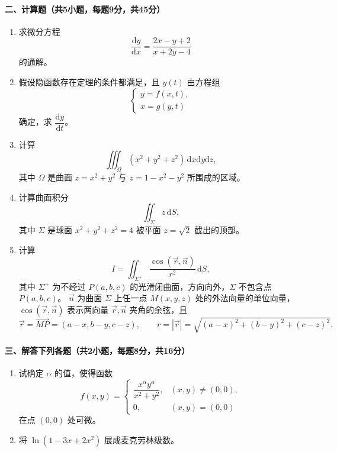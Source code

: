 \paragraph*{二、计算题（共5小题，每题9分，共45分）}
\begin{enumerate}
  \item 求微分方程
  \[
    \frac{\mathrm{d}y}{\mathrm{d}x}=\frac{2x-y+2}{x+2y-4}
  \]
  的通解。

  \item 假设隐函数存在定理的条件都满足，且 \(y(t)\) 由方程组
  \[
    \begin{cases}
      y=f(x,t),\\
      x=g(y,t)
    \end{cases}
  \]
  确定，求 \(\dfrac{\mathrm{d}y}{\mathrm{d}t}\)。

  \item 计算
  \[
    \iiint_\Omega (x^2+y^2+z^2)\,\mathrm{d}x\mathrm{d}y\mathrm{d}z,
  \]
  其中 \(\Omega\) 是曲面 \(z=x^2+y^2\) 与 \(z=1-x^2-y^2\) 所围成的区域。

  \item 计算曲面积分
  \[
    \iint_\Sigma z\,\mathrm{d}S,
  \]
  其中 \(\Sigma\) 是球面 \(x^2+y^2+z^2=4\) 被平面 \(z=\sqrt2\) 截出的顶部。

  \item 计算
  \[
    I=\iint_{\Sigma^+}\frac{\cos(\vec r,\vec n)}{r^2}\,\mathrm{d}S,
  \]
  其中 \(\Sigma^+\) 为不经过 \(P(a,b,c)\) 的光滑闭曲面，方向向外，\(\Sigma\) 不包含点 \(P(a,b,c)\)。
  \(\vec n\) 为曲面 \(\Sigma\) 上任一点 \(M(x,y,z)\) 处的外法向量的单位向量，\(\cos(\vec r,\vec n)\) 表示两向量 \(\vec r,\vec n\) 夹角的余弦，且
  \[
    \vec r=\overrightarrow{MP}=(a-x,b-y,c-z),\qquad
    r=|\vec r|=\sqrt{(a-x)^2+(b-y)^2+(c-z)^2}.
  \]
\end{enumerate}

\paragraph*{三、解答下列各题（共2小题，每题8分，共16分）}
\begin{enumerate}
  \item 试确定 \(\alpha\) 的值，使得函数
  \[
    f(x,y)=
    \begin{cases}
      \dfrac{x^\alpha y^\alpha}{x^2+y^2}, & (x,y)\ne(0,0),\\
      0, & (x,y)=(0,0)
    \end{cases}
  \]
  在点 \((0,0)\) 处可微。
  \item 将 \(\ln(1-3x+2x^2)\) 展成麦克劳林级数。
\end{enumerate}

